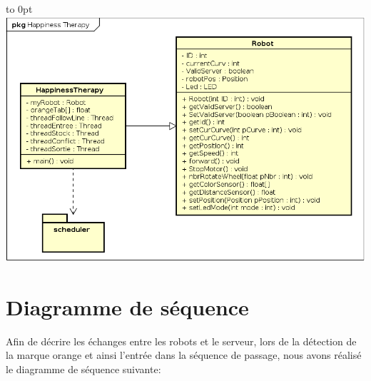 \documentclass[french,a4paper,12pt]{report}
\begin{document}
\hfill\hbox to 0pt{\hss\includegraphics[width=21cm]{HappinessTherapy.png}\hss}\hfill\null\newline

\section{Diagramme de séquence}

Afin de décrire les échanges entre les robots et le serveur, lors de la détection de la marque orange et ainsi l'entrée dans la séquence de passage, nous avons réalisé le diagramme de séquence suivante:
\end{document}
